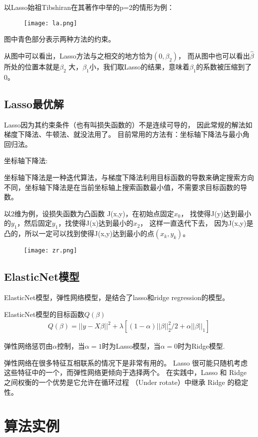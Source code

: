 \documentclass[12pt]{article}
\begin{document}
以Lasso始祖Tibshiran在其著作中举的p=2的情形为例：
\begin{figure}[htbp]
	\centering
	\texttt{[image: la.png]}
\end{figure}

图中青色部分表示两种方法的约束。

从图中可以看出，Lasso方法与之相交的地方恰为$(0,\beta_2)$，
而从图中也可以看出$\hat{\beta}$所处的位置本就是$\beta_2$ 
大，$\beta_1$小，我们取Lasso的结果，意味着$\beta_1$的系数被压缩到了0。



\subsection{Lasso最优解}
Lasso因为其约束条件（也有叫损失函数的）不是连续可导的，
因此常规的解法如梯度下降法、牛顿法、就没法用了。
目前常用的方法有：坐标轴下降法与最小角回归法。

坐标轴下降法:

坐标轴下降法是一种迭代算法，与梯度下降法利用目标函数的导数来确定搜索方向不同，坐标轴下降法是在当前坐标轴上搜索函数最小值，不需要求目标函数的导数。

以2维为例，设损失函数为凸函数 J(x,y)，在初始点固定$x_0$，
找使得J(y)达到最小的$y_1$，然后固定$y_1$，找使得J(x)达到最小的$x_2$，
这样一直迭代下去，
因为J(x,y)是凸的，所以一定可以找到使得J(x,y)达到最小的点$(x_k,y_k)$。
\begin{figure}[htbp]
	\centering
	\texttt{[image: zr.png]}
\end{figure}

\subsection{ElasticNet模型}
ElasticNet模型，弹性网络模型，是结合了lasso和ridge regression的模型。

ElasticNet模型的目标函数$Q(\beta)$ 
\begin{gather}
	Q(\beta)=||y-X\beta||^2+\lambda[(1-\alpha)||\beta||_2^2/2+\alpha||\beta||_1]
\end{gather}

弹性网络惩罚由$\alpha$控制，当$\alpha=1$时为Lasso模型，当$\alpha=0$时为Ridge模型.

弹性网络在很多特征互相联系的情况下是非常有用的。
Lasso 很可能只随机考虑这些特征中的一个，而弹性网络更倾向于选择两个。 
在实践中，Lasso 和 Ridge 之间权衡的一个优势是它允许在循环过程
（Under rotate）中继承 Ridge 的稳定性。

\section{算法实例}
\end{document}
